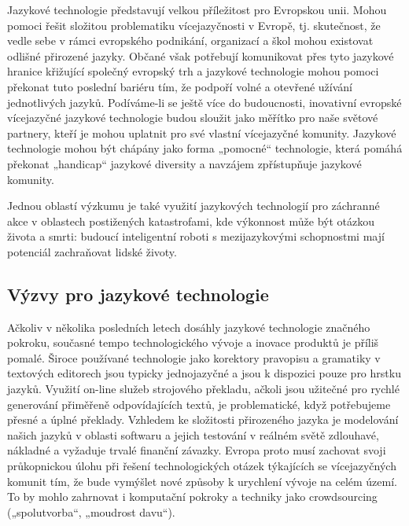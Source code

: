 \begin{multicols}{2}

Jazykové technologie představují velkou příležitost pro Evropskou unii. Mohou pomoci řešit složitou problematiku vícejazyčnosti v Evropě, tj. skutečnost, že vedle sebe v rámci evropského podnikání, organizací a škol mohou existovat odlišné přirozené jazyky. Občané však potřebují komunikovat přes tyto jazykové hranice křižující společný evropský trh a jazykové technologie mohou pomoci překonat tuto poslední bariéru tím, že podpoří volné a otevřené užívání jednotlivých jazyků. Podíváme-li se ještě více do budoucnosti, inovativní evropské vícejazyčné jazykové technologie budou sloužit jako měřítko pro naše světové partnery, kteří je mohou uplatnit pro své vlastní vícejazyčné komunity. Jazykové technologie mohou být chápány jako forma „pomocné“ technologie, která pomáhá překonat „handicap“ jazykové diversity a navzájem zpřístupňuje jazykové komunity.

Jednou oblastí výzkumu je také využití jazykových technologií pro záchranné akce v oblastech postižených katastrofami, kde výkonnost může být otázkou života a smrti: budoucí inteligentní roboti s mezijazykovými schopnostmi mají potenciál zachraňovat lidské životy.

\subsection{Výzvy pro jazykové technologie}

Ačkoliv v několika posledních letech dosáhly jazykové technologie značného pokroku, současné tempo technologického vývoje a inovace produktů je příliš pomalé. Široce používané technologie jako korektory pravopisu a gramatiky v textových editorech jsou typicky jednojazyčné a jsou k dispozici pouze pro hrstku jazyků. Využití on-line služeb strojového překladu, ačkoli jsou užitečné pro rychlé generování přiměřeně odpovídajících textů, je problematické, když potřebujeme přesné a úplné překlady. Vzhledem ke složitosti přirozeného jazyka je modelování našich jazyků v oblasti softwaru a jejich testování v reálném světě zdlouhavé, nákladné a vyžaduje trvalé finanční závazky. Evropa proto musí zachovat svoji průkopnickou úlohu při řešení technologických otázek týkajících se vícejazyčných komunit tím, že bude vymýšlet nové způsoby k urychlení vývoje na celém území. To by mohlo zahrnovat i komputační pokroky a techniky jako crowdsourcing („spolutvorba“, „moudrost davu“).



\end{multicols}
